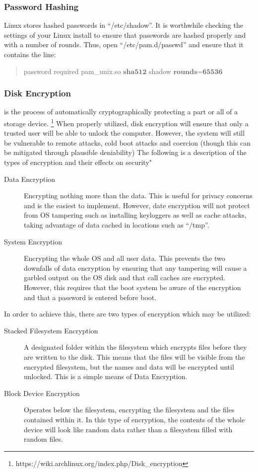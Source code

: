 \documentclass[a4paper,11pt]{book}
\begin{document}
		\subsubsection{Password Hashing}
			Linux stores hashed passwords in ``/etc/shadow''. 
			It is worthwhile checking the settings of your Linux install to ensure that passwords are hashed properly and with a number of rounds. Thus, open ``/etc/pam.d/passwd'' and ensure that it contains the line:
			\begin{quote}
				password required pam\_unix.so $\textbf{sha512}$ shadow $\textbf{rounds=65536}$
			\end{quote}
		\subsubsection{Disk Encryption}
			is the process of automatically cryptographically protecting a part or all of a storage device.
			\footnote{https://wiki.archlinux.org/index.php/Disk\_encryption}
			When properly utilized, disk encryption will ensure that only a trusted user will be able to unlock the computer. 
			However, the system will still be vulnerable to remote attacks, cold boot attacks and coercion (though this can be mitigated through plausible deniability)
			The following is a description of the types of encryption and their effects on security"
			\begin{description}
				\item[Data Encryption] Encrypting nothing more than the data. 
					This is useful for privacy concerns and is the easiest to implement. 
					However, date encryption will not protect from OS tampering such as installing keyloggers as well as cache attacks, taking advantage of data cached in locations such as ``/tmp''.
				\item[System Encryption] Encrypting the whole OS and all user data. 
					This prevents the two downfalls of data encryption by ensuring that any tampering will cause a garbled output on the OS disk and that call caches are encrypted. 
					However, this requires that the boot system be aware of the encryption and that a password is entered before boot. 
			\end{description}
			In order to achieve this, there are two types of encryption which may be utilized:
			\begin{description}
				\item[Stacked Filesystem Encryption] A designated folder within the filesystem which encrypts files before they are written to the disk. 
					This means that the files will be visible from the encrypted filesystem, but the names and data will be encrypted until unlocked. 
					This is a simple means of Data Encryption. 
				\item[Block Device Encryption] Operates below the filesystem, encrypting the filesystem and the files contained within it. 
					In this type of encryption, the contents of the whole device will look like random data rather than a filesystem filled with random files. 
			\end{description}
\end{document}
